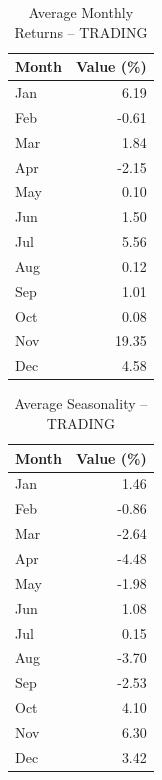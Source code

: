 \documentclass[12pt]{article}
\begin{document}
\begin{table}[h!]
\centering
\caption{Average Monthly Returns -- TRADING}
\begin{tabular}{l r}
\toprule
Month & Value (\%) \\
\midrule
Jan & 6.19 \\
Feb & -0.61 \\
Mar & 1.84 \\
Apr & -2.15 \\
May & 0.10 \\
Jun & 1.50 \\
Jul & 5.56 \\
Aug & 0.12 \\
Sep & 1.01 \\
Oct & 0.08 \\
Nov & 19.35 \\
Dec & 4.58 \\
\bottomrule
\end{tabular}
\end{table}

\begin{table}[h!]
\centering
\caption{Average Seasonality -- TRADING}
\begin{tabular}{l r}
\toprule
Month & Value (\%) \\
\midrule
Jan & 1.46 \\
Feb & -0.86 \\
Mar & -2.64 \\
Apr & -4.48 \\
May & -1.98 \\
Jun & 1.08 \\
Jul & 0.15 \\
Aug & -3.70 \\
Sep & -2.53 \\
Oct & 4.10 \\
Nov & 6.30 \\
Dec & 3.42 \\
\bottomrule
\end{tabular}
\end{table}


\clearpage
\end{document}
